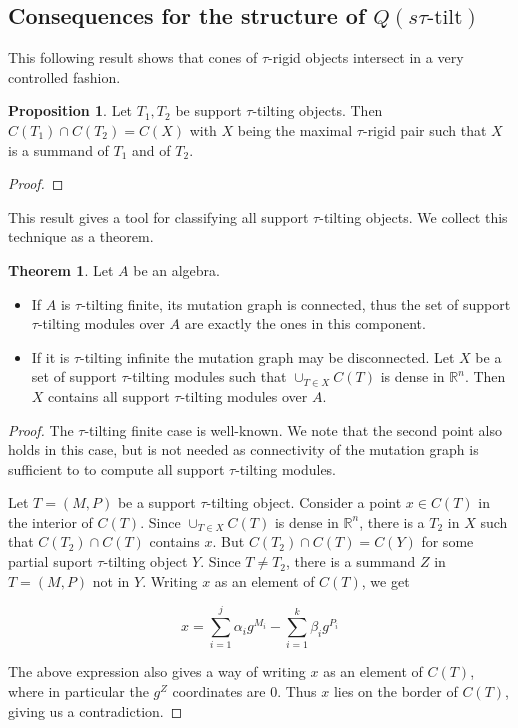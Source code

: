 \documentclass[]{article}
\theoremstyle{definition}
\newtheorem{theorem}{Theorem}[section]
\newtheorem{proposition}{Proposition}[section]
\newcommand{\tu}{\ensuremath{\tau}}
\begin{document}
\subsection{Consequences for the structure of $Q(s\tu\text{-tilt})$}


This following result shows that cones of $\tau$-rigid objects intersect in a very controlled fashion.

\begin{proposition}\cite[Corollary 6.7, b)]{dij17}
	Let $T_1,T_2$ be support \tu-tilting objects. Then $C(T_1) \cap C(T_2) = C(X)$ with $X$ being the maximal \tu-rigid pair such that $X$ is a summand of $T_1$ and of $T_2$.
\end{proposition}

\begin{proof}
\end{proof}


This result gives a tool for classifying all support \tu-tilting objects. We collect this technique as a theorem.

\begin{theorem}\cite{dij17}
	Let $A$ be an algebra.
	
	\begin{itemize}
		\item If $A$ is \tu-tilting finite, its mutation graph is connected, thus the set of support \tu-tilting modules over $A$ are exactly the ones in this component.
		\item If it is \tu-tilting infinite the mutation graph may be disconnected. Let $X$ be a set of support \tu-tilting modules such that $\cup_{T \in X} C(T)$ is dense in $\mathbb{R}^n$. Then $X$ contains all support \tu-tilting modules over $A$.
		
	\end{itemize}
\end{theorem}

\begin{proof}
	The \tu-tilting finite case is well-known. We note that the second point also holds in this case, but is not needed as connectivity of the mutation graph is sufficient to to compute all support \tu-tilting modules.
	
	Let $T = (M,P)$ be a support \tu-tilting object. Consider a point $x \in C(T)$ in the interior of $C(T)$. Since $\cup_{T \in X} C(T)$ is dense in $\mathbb{R}^n$, there is a $T_2$ in $X$ such that $C(T_2) \cap C(T)$ contains $x$. But $C(T_2)\cap C(T) = C(Y)$ for some partial suport \tu-tilting object $Y$. Since $T \neq T_2$, there is a summand $Z$ in $T = (M,P)$ not in $Y$. Writing $x$ as an element of $C(T)$, we get
	
	\[x = \sum_{i = 1}^{j} \alpha_ig^{M_i} - \sum_{i = 1}^{k}\beta_ig^{P_i}\]

	The above expression also gives a way of writing $x$ as an element of  $C(T)$, where in particular the $g^{Z}$ coordinates are $0$. Thus $x$ lies on the border of $C(T)$, giving us a contradiction.
	
\end{proof}
\end{document}
